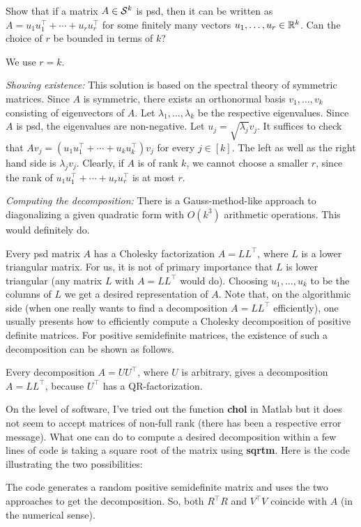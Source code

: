 \begin{exercise}
	\label{sdp:sum:rank:1}
	Show that if a matrix $A \in \mathcal{S}^k$ is psd, then it can be written as $A = u_1 u_1^\top + \cdots + u_r u_r^\top$ for some finitely many vectors $u_1,\ldots,u_r \in \mathbb{R}^k$. Can the choice of $r$ be bounded in terms of $k$?
\end{exercise}
\begin{solution}
	We use $r=k$. 
	
	\emph{Showing existence:} This solution is based on the spectral theory of symmetric matrices. 
	Since $A$ is symmetric, there exists an orthonormal basis $v_1,\ldots,v_k$ consisting of eigenvectors of $A$. Let $\lambda_1,\ldots,\lambda_k$ be the respective eigenvalues. Since $A$ is psd, the eigenvalues are non-negative. Let $u_j = \sqrt{\lambda_j} v_j$. It suffices to check that $A v_j = (u_1 u_1^\top + \cdots + u_k u_k^\top) v_j$ for every $j\in[k]$. The left as well as the right hand side is $\lambda_j v_j$. Clearly, if $A$ is of rank $k$, we cannot choose a smaller $r$, since the rank of $u_1 u_1^\top + \cdots + u_r u_r^\top$ is at most $r$. 
	
	\emph{Computing the decomposition:} There is a Gauss-method-like approach to diagonalizing a given quadratic form with $O(k^3)$ arithmetic operations. This would definitely do. 
	
	Every psd matrix $A$ has a Cholesky factorization $A = L L^\top$, where $L$ is a lower triangular matrix. For us, it is not of primary importance that $L$ is lower triangular (any matrix $L$ with $A = LL^\top$ would do). 
	Choosing $u_1,\ldots,u_k$ to be the columns of $L$ we get a desired representation of $A$. Note that, on the algorithmic side (when one really wants to find a decomposition $A=L L^\top$ efficiently), one usually presents how to efficiently compute a Cholesky decomposition of positive definite matrices. For positive semidefinite matrices, the existence of such a decomposition can be shown as follows. 
	
	
	Every decomposition $A=UU^\top$, where $U$ is arbitrary, gives a decomposition $A=LL^\top$, because $U^\top$ has a QR-factorization. 
	
	On the level of software, I've tried out the function \textbf{chol} in Matlab but it does not seem to accept matrices of non-full rank (there has been a respective error message). What one can do to compute a desired decomposition within a few lines of code is taking a square root of the matrix using \textbf{sqrtm}. Here is the code illustrating the two possibilities:
	
		
	
	The code generates a random positive semidefinite matrix and uses the two approaches to get the decomposition. So, both $R^\top R$ and $V^\top V$ coincide with $A$ (in the numerical sense). 
\end{solution}

